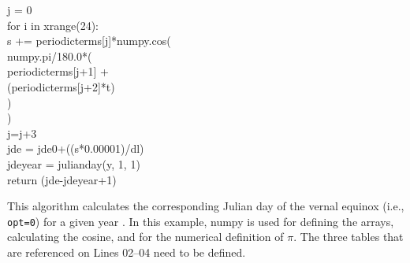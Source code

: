 { \indent j = 0 \\
 \indent for i in xrange(24): \\
 \indent \indent s += periodic\textunderscore terms[j]*numpy.cos( \\
 \indent \indent \indent numpy.pi/180.0*(\\
 \indent \indent \indent \indent periodic\textunderscore terms[j+1] + \\
 \indent \indent \indent \indent (periodic\textunderscore terms[j+2]*t) \\
 \indent \indent \indent ) \\
 \indent \indent ) \\
 \indent \indent j=j+3 \\
 \indent jde = jde0+((s*0.00001)/dl) \\
 \indent jde\textunderscore year = julian\textunderscore day(y, 1, 1) \\
 \indent return (jde-jde\textunderscore year+1) \\
}

This algorithm calculates the corresponding Julian day of the vernal equinox (i.e., \texttt{opt=0}) for a given year \parencite[Ch. 26]{meeus91}. 
In this example, numpy is used for defining the arrays, calculating the cosine, and for the numerical definition of $\pi$. 
The three tables that are referenced on Lines 02--04 need to be defined. 